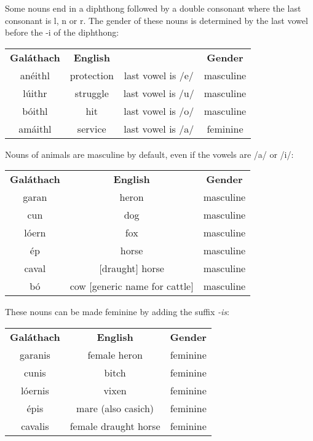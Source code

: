 Some nouns end in a diphthong followed by a double consonant where the last consonant is l, n or r. The gender of these nouns is determined by the last vowel before the -i of the diphthong:
\begin{table}[H]
\centering
\begin{tabular}{cccc}
  \toprule
  \textbf{Gal\'{a}thach} & \textbf{English} & & \textbf{Gender}\\
  \cmidrule(lr){1-1}\cmidrule(lr){2-2}\cmidrule(lr){4-4}
  an\'{e}ithl & protection & last vowel is /e/ & masculine\\
  l\'{u}ithr & struggle & last vowel is /u/ & masculine\\
  b\'{o}ithl & hit & last vowel is /o/ & masculine\\
  am\'{a}ithl & service & last vowel is /a/ & feminine\\
  \bottomrule
\end{tabular}
\label{example_gender_end_diphthong_double_consonant}
\end{table}

Nouns of animals are masculine by default, even if the vowels are /a/ or /i/:
\begin{table}[H]
\centering
\begin{tabular}{ccc}
  \toprule
  \textbf{Gal\'{a}thach} & \textbf{English} & \textbf{Gender}\\
  \cmidrule(lr){1-1}\cmidrule(lr){2-2}\cmidrule(lr){3-3}
  garan & heron & masculine\\
  cun & dog & masculine\\
  l\'{o}ern & fox & masculine\\
  \'{e}p & horse & masculine\\
  caval & $[$draught$]$ horse & masculine\\
  b\'{o} & cow $[$generic name for cattle$]$ & masculine\\
  \bottomrule
\end{tabular}
\label{example_gender_animals}
\end{table}

These nouns can be made feminine by adding the suffix \textit{-is}:
\begin{table}[H]
\centering
\begin{tabular}{ccc}
  \toprule
  \textbf{Gal\'{a}thach} & \textbf{English} & \textbf{Gender}\\
  \cmidrule(lr){1-1}\cmidrule(lr){2-2}\cmidrule(lr){3-3}
  garanis & female heron & feminine\\
  cunis & bitch & feminine\\
  l\'{o}ernis & vixen & feminine\\
  \'{e}pis & mare (also casich) & feminine\\
  cavalis & female draught horse & feminine\\
  \bottomrule
\end{tabular}
\label{example_gender_animals_femalize}
\end{table}

